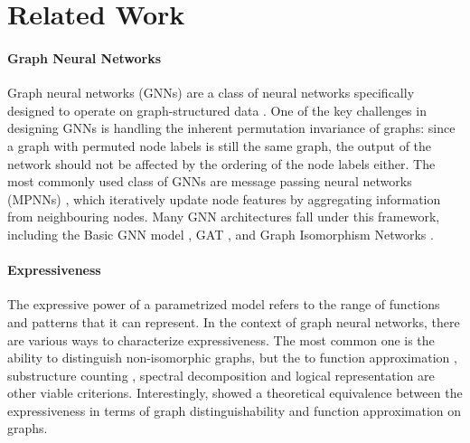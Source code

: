\documentclass{article}
\begin{document}
\section{Related Work}

\paragraph{Graph Neural Networks}
Graph neural networks (GNNs) are a class of neural networks specifically designed to operate on graph-structured data \cite{scarselli2008graph}. One of the key challenges in designing GNNs is handling the inherent permutation invariance of graphs: since a graph with permuted node labels is still the same graph, the output of the network should not be affected by the ordering of the node labels either.
The most commonly used class of GNNs are message passing neural networks (MPNNs) \cite{gilmer2017neural}, which iteratively update node features by aggregating information from neighbouring nodes. Many GNN architectures fall under this framework, including the Basic GNN model \cite{hamilton2020graph}, GAT \cite{velickovic2017graph}, and Graph Isomorphism Networks \cite{xu2018powerful}.


\paragraph{Expressiveness}
The expressive power of a parametrized model refers to the range of functions and patterns that it can represent. 
In the context of graph neural networks, there are various ways to characterize expressiveness. The most common one is the ability to distinguish non-isomorphic graphs, but the to function approximation \cite{maron2019universality}, substructure counting \cite{chen2020can}, spectral decomposition \cite{balcilar2020analyzing} and logical representation \cite{barcelo2020logical} are other viable criterions. Interestingly, \cite{chen2019equivalence} showed a theoretical equivalence between the expressiveness in terms of graph distinguishability and function approximation on graphs.
\end{document}

